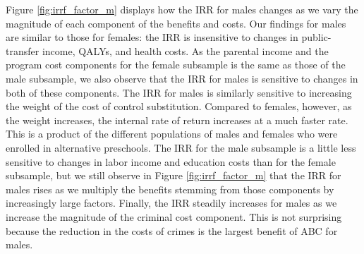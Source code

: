 \noindent Figure \ref{fig:irrf_factor_m} displays how the IRR for males changes as we vary the magnitude
of each component of the benefits and costs. Our findings for males are similar to
those for females: the IRR is insensitive to changes in public-transfer income, QALYs, and health costs. 
As the parental income and the program cost components for the female subsample is 
the same as those of the male subsample, we also observe that the IRR for males 
is sensitive to changes in both of these components. The IRR for males is similarly sensitive to increasing the weight of the cost of control substitution. Compared to females, however, as the weight increases, the internal rate of return increases at a much faster rate. This is a product of the different populations of males and females who were enrolled in alternative preschools.
The IRR for the male subsample is a little less sensitive to changes in labor income
and education costs than for the female subsample, but we still observe in Figure \ref{fig:irrf_factor_m}
that the IRR for males rises as we multiply the benefits stemming from those components 
by increasingly large factors. 
Finally, the IRR steadily 
increases for males as we increase the magnitude of the criminal cost component. 
This is not surprising because the reduction in the costs of crimes is the largest 
benefit of ABC for males. 


